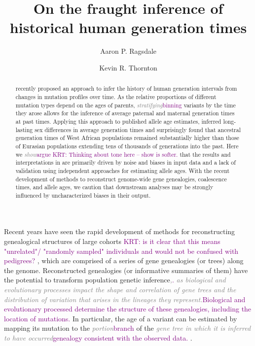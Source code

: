 \documentclass[]{article}
\title{On the fraught inference of historical human generation times}
\author[1,*]{Aaron P. Ragsdale}
\author[2]{Kevin R. Thornton}
\affil[1]{University of Wisconsin--Madison, Wisconsin, USA}
\affil[2]{University of California, Irvine, California, USA}
\affil[*]{apragsdale@wisc.edu}
\newcommand{\krtcomment}[1]{{\textcolor{purple}{KRT: #1}}}
\newcommand{\krtedit}[2]{{\emph{\textcolor{gray}{#1}}}{\textcolor{purple}{#2}}}
\begin{document}
\maketitle

\begin{abstract}

    \noindent \citet{wang2023human} recently proposed an approach to infer the
    history of human generation intervals from changes in mutation profiles
    over time. As the relative proportions of different mutation types depend
    on the ages of parents, \krtedit{stratifying}{binning} variants by the time they arose allows
    for the inference of average paternal and maternal generation times at past
    times. Applying this approach to published allele age estimates,
    \citet{wang2023human} inferred long-lasting sex differences in average
    generation times and surprisingly found that ancestral generation times of
    West African populations remained substantially higher than those of
    Eurasian populations extending tens of thousands of generations into the
    past. Here we \krtedit{show}{argue} \krtcomment{Thinking about tone here --
    show is softer.} that the results and interpretations in
    \citet{wang2023human} are primarily driven by noise and biases in input
    data and a lack of validation using independent approaches for estimating
    allele ages. With the recent development of methods to reconstruct
    genome-wide gene genealogies, coalescence times, and allele ages, we
    caution that downstream analyses may be strongly influenced by
    uncharacterized biases in their output.

\end{abstract}

Recent years have seen the rapid development of methods for reconstructing
genealogical structures of large cohorts \krtcomment{is it clear that this means "unrelated"/
"randomly sampled" individuals and would not be confused with pedigrees?}
\citep{speidel2019method,wohns2022unified,hubisz2020mapping}, which are
comprised of a series of gene genealogies (or trees) along the genome.
Reconstructed genealogies (or informative summaries of them) have the potential
to transform population genetic inference\krtedit{,}{.} \krtedit{as biological and evolutionary
processes impact the shape and correlation of gene trees and the distribution
of variation that arises in the lineages they represent.}{Biological and evolutionary
processed determine the structure of these genealogies, including the location of mutations.} In particular, the age
of a variant can be estimated by mapping its mutation to the \krtedit{portion}{branch} of the
\krtedit{gene tree in which it is inferred to have occurred}{genealogy consistent with the observed data.} \citep{albers2020dating}.
\end{document}
